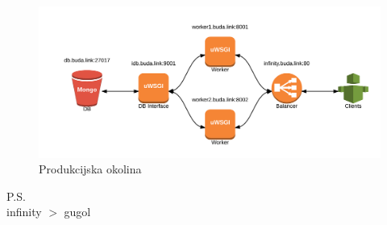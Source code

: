 \documentclass[a4paper]{article}
\begin{document}
\begin{figure}[!htbp]
\begin{center}
\includegraphics[width=\textwidth]{infinity.png}
\end{center}
\caption{Produkcijska okolina}\label{production_environment}
\end{figure}

\vspace{1cm}
P.S.
\\[0.3cm]
infinity $>$ gugol



\end{document}
